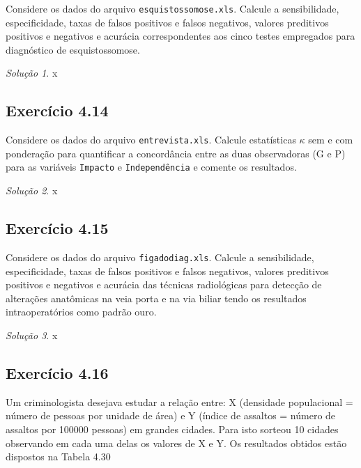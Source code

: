 \documentclass[
]{latex/krantz}
\theoremstyle{definition}
\theoremstyle{definition}
\theoremstyle{definition}
\theoremstyle{definition}
\theoremstyle{remark}
\newtheorem*{solution}{Solução}
\begin{document}
Considere os dados do arquivo \texttt{esquistossomose.xls}. Calcule a sensibilidade, especificidade, taxas de falsos positivos e falsos negativos, valores preditivos positivos e negativos e acurácia correspondentes aos cinco testes empregados para diagnóstico de esquistossomose.

\begin{solution}
x
\end{solution}

\hypertarget{exr4-14}{%
\subsection*{Exercício 4.14}\label{exr4-14}}

Considere os dados do arquivo \texttt{entrevista.xls}. Calcule estatísticas \(\kappa\) sem e com ponderação para quantificar a concordância entre as duas observadoras (G e P) para as variáveis \texttt{Impacto} e \texttt{Independência} e comente os resultados.

\begin{solution}
x
\end{solution}

\hypertarget{exr4-15}{%
\subsection*{Exercício 4.15}\label{exr4-15}}

Considere os dados do arquivo \texttt{figadodiag.xls}. Calcule a sensibilidade, especificidade, taxas de falsos positivos e falsos negativos, valores preditivos positivos e negativos e acurácia das técnicas radiológicas para detecção de alterações anatômicas na veia porta e na via biliar tendo os resultados intraoperatórios como padrão ouro.

\begin{solution}
x
\end{solution}

\hypertarget{exr4-16}{%
\subsection*{Exercício 4.16}\label{exr4-16}}

Um criminologista desejava estudar a relação entre: X (densidade populacional = número de pessoas por unidade de área) e Y (índice de assaltos = número de assaltos por 100000 pessoas) em grandes cidades. Para isto sorteou 10 cidades observando em cada uma delas os valores de X e Y. Os resultados obtidos estão dispostos na Tabela 4.30
\end{document}
